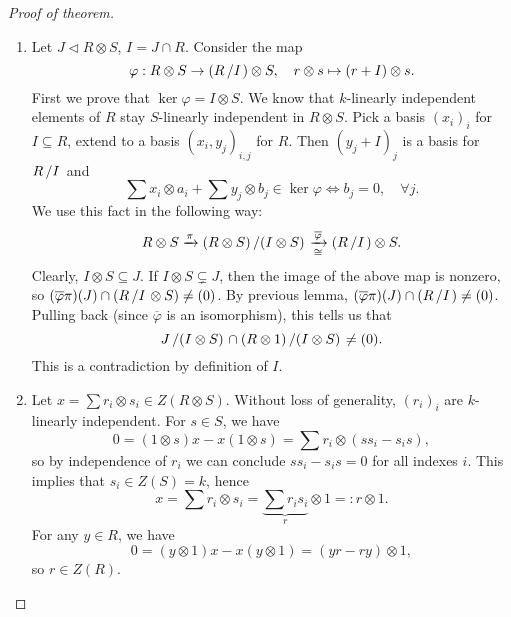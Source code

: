 \documentclass[10pt, a4paper]{article}
\newenvironment{noticeC}{%
  \tcolorbox[%
  notitle,
  empty,
  enhanced,  %
  breakable,
  coltext=black, 
  fontupper=\rmfamily,
  noparskip,
  sharp corners,
  boxrule=-1pt,  %
  frame hidden,
  left=7pt,  %
  right=7pt,
  top=5pt,
  bottom=5pt,
  before skip=2.5ex plus 2pt,
  after skip=2.5ex plus 2pt,
  overlay unbroken and last={%
  },
  ]}
{\endtcolorbox}
\newenvironment{myproof}%
  {\begin{noticeC}\begin{proof}}%
  {\end{proof}\end{noticeC}}
\newcommand{\quot}[2]{{\raisebox{0em}{$#1$}\left/\raisebox{0em}{$#2$}\right.}}
\begin{document}
\begin{myproof}[Proof of theorem]
  \begin{enumerate}
    \item Let $J \lhd R \otimes S$, $I = J \cap R$. Consider the map 
    $$\varphi: R \otimes S \to \left(\quot{R}{I}\right) \otimes S,\quad r \otimes s \mapsto (r + I) \otimes s.$$
    First we prove that $\ker \varphi = I \otimes S$. We know that $k$-linearly independent elements of $R$ 
    stay $S$-linearly independent in $R \otimes S$. Pick a basis $(x_i)_i$ 
    for $I \subseteq R$, extend to a basis $(x_i, y_j)_{i, j}$ for $R$.
    Then $(y_j + I)_j$ is a basis for $\quot{R}{I}$ and 
    $$\sum x_i \otimes a_i + \sum y_j \otimes b_j \in \ker \varphi \Leftrightarrow b_j = 0,\quad \forall j.$$
    We use this fact in the following way:
    $$R \otimes S \xrightarrow{\pi} \quot{(R \otimes S)}{(I \otimes S)} \xrightarrow[\cong]{\overline{\varphi}} (\quot{R}{I}) \otimes S.$$
    Clearly, $I \otimes S \subseteq J$. If $I \otimes S \subsetneq J$, then the image of the above map is nonzero, so 
    $(\overline{\varphi} \pi) (J) \cap (\quot{R}{I} \otimes S) \neq (0)$. By previous lemma, $(\overline{\varphi} \pi) (J) \cap (\quot{R}{I}) \neq (0)$.
    Pulling back (since $\overline{\varphi}$ is an isomorphism), this tells us that 
    $$\quot{J}{(I \otimes S)} \cap \quot{(R \otimes 1)}{(I \otimes S)} \neq (0).$$
    This is a contradiction by definition of $I$.
    \item Let $x = \sum r_i \otimes s_i \in Z(R \otimes S)$. Without loss of generality, $(r_i)_i$ are $k$-linearly independent.
    For $s \in S$, we have 
    $$0 = (1 \otimes s) x - x (1 \otimes s) = \sum r_i \otimes (s s_i - s_i s),$$
    so by independence of $r_i$ we can conclude $s s_i - s_i s = 0$ for all indexes $i$.
    This implies that $s_i \in Z(S) = k$, hence
    $$x = \sum r_i \otimes s_i = \underbrace{\sum r_i s_i}_{r} \otimes 1 =: r \otimes 1.$$
    For any $y \in R$, we have 
    $$0 = (y \otimes 1) x - x (y \otimes 1) = (yr - ry) \otimes 1,$$
    so $r \in Z(R)$. \qedhere
  \end{enumerate}
\end{myproof}
\end{document}

